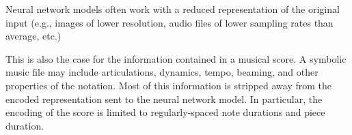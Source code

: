 
Neural network models often work with a reduced
representation of the original input (e.g., images of lower
resolution, audio files of lower sampling rates than
average, etc.)

This is also the case for the information contained in a
musical score. A symbolic music file may include
articulations, dynamics, tempo, beaming, and other
properties of the notation. Most of this information is
stripped away from the encoded representation sent to the
neural network model. In particular, the encoding of the
score is limited to regularly-spaced note durations and
piece duration.